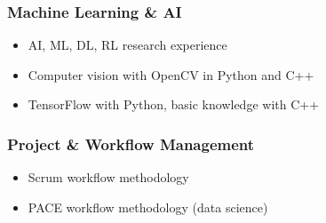 \documentclass[a4paper,9pt]{article}
\newcommand{\coloritem}[2]{
    \item[{\color{#1}$\bullet$}] #2
}
\begin{document}
\begin{minipage}[t]{0.34\textwidth}
\vspace{-2.2mm}
\subsubsection*{Machine Learning \& AI}
\vspace{-1.2mm}
\begin{itemize}
    \coloritem{blue}{AI, ML, DL, RL research experience}
    \coloritem{blue}{Computer vision with OpenCV in Python and C++}
    \coloritem{blue}{TensorFlow with Python, basic knowledge with C++}
\end{itemize}


\vspace{-2.2mm}
\subsubsection*{Project \& Workflow Management}
\vspace{-1.2mm}
\begin{itemize}
    \coloritem{blue}{Scrum workflow methodology}
    \coloritem{blue}{PACE workflow methodology (data science)}
\end{itemize}


\end{minipage}
\end{document}
